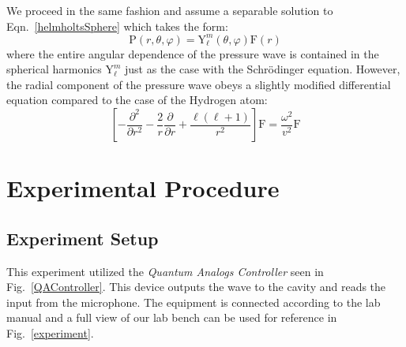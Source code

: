 \documentclass[12pt]{article}
\newcommand{\ppd}[1]{\frac{\partial}{\partial#1}}
\newcommand{\ppsd}[1]{\frac{\partial^2}{\partial #1^2}}
\newcommand{\figref}[1]{Fig.\ \ref{#1}}
\let\originaleqref=\eqref
\renewcommand{\eqref}{Eqn.\ \originaleqref}
\begin{document}
We proceed in the same fashion and assume a separable solution to \eqref{helmholtsSphere} which takes the form:
\begin{equation}
	\mathrm{P}(r,\theta,\varphi) = \mathrm{Y}_\ell^m(\theta,\varphi) \mathrm{F}(r)
\end{equation}
where the entire angular dependence of the pressure wave is contained in the spherical harmonics $\mathrm{Y}_\ell^m$ just as the case with the Schr\"odinger equation. However, the radial component of the pressure wave obeys a slightly modified differential equation compared to the case of the Hydrogen atom:
\begin{equation}
	\left[ -\ppsd{r} - \frac{2}{r}\ppd{r} + \frac{\ell(\ell+1)}{r^2} \right] \mathrm{F} = \frac{\omega^2}{v^2}\mathrm{F}
\end{equation}


	
\section{Experimental Procedure}

	\subsection{Experiment Setup}

	This experiment utilized the \emph{Quantum Analogs Controller} seen in \figref{QAController}. This device outputs the wave to the cavity and reads the input from the microphone. The equipment is connected according to the lab manual \cite{labManual} and a full view of our lab bench can be used for reference in \figref{experiment}.
	
\end{document}

